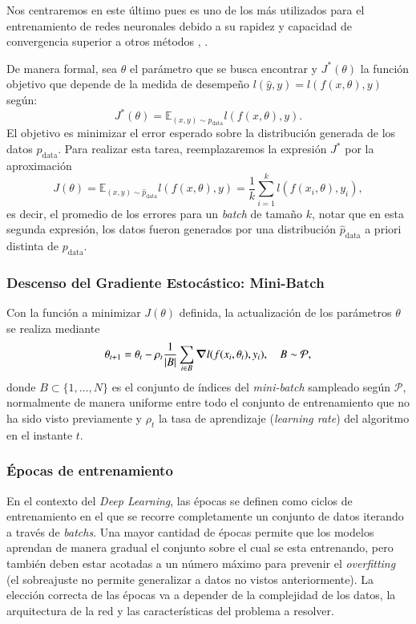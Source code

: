 Nos centraremos en este último pues es uno de los más utilizados para el entrenamiento de redes neuronales debido a su rapidez y capacidad de convergencia superior a otros métodos \cite{WILSON20031429}, \cite{article}.

\vspace{0.2cm}

De manera formal, sea $\theta$ el parámetro que se busca encontrar y $J^{*}(\theta)$ la función objetivo que depende de la medida de desempeño $l(\hat{y},y) = l(f(x , \theta),y) $ según: 
\[
J^{*}(\theta) = \mathbb{E}_{(x,y) \sim p_{\text{data}}} l(f(x , \theta),y) .
\]
El objetivo es minimizar el error esperado sobre la distribución generada de los datos $p_{\text{data}}$. Para realizar esta tarea, reemplazaremos la expresión $J^{*}$ por la aproximación 
\[
J(\theta) = \mathbb{E}_{(x,y) \sim \hat{p}_{\text{data}}} l(f(x , \theta),y) = \frac{1}{k}\sum_{i=1}^{k}l(f(x_i , \theta),y_i) , 
\]
es decir, el promedio de los errores para un \textit{batch} de tamaño $k$, notar que en esta segunda expresión, los datos fueron generados por una distribución $\hat{p}_{\text{data}}$ a priori distinta de $p_{\text{data}}$. 

\subsubsection{Descenso del Gradiente Estocástico: Mini-Batch}

Con la función a minimizar $J(\theta)$ definida, la actualización de los parámetros $\theta$ se realiza mediante 
\[
\theta_{t+1} = \theta_t - \rho_t \frac{1}{|B|}\sum_{i \in B}\grad l(f(x_i , \theta_t),y_i) , \quad B \sim \mathcal{P} ,  
\]
donde $B \subset \{1 , \dots , N\}$ es el conjunto de índices del \textit{mini-batch} sampleado según $\mathcal{P}$, normalmente de manera uniforme entre todo el conjunto de entrenamiento que no ha sido visto previamente y $\rho_t$ la tasa de aprendizaje (\textit{learning rate}) del algoritmo en el instante $t$. 

\subsubsection{Épocas de entrenamiento}

En el contexto del \textit{Deep Learning}, las épocas se definen como ciclos de entrenamiento en el que se recorre completamente un conjunto de datos iterando a través de \textit{batchs}. Una mayor cantidad de épocas permite que los modelos aprendan de manera gradual el conjunto sobre el cual se esta entrenando, pero también deben estar acotadas a un número máximo para prevenir el \textit{overfitting} (el sobreajuste no permite generalizar a datos no vistos anteriormente). La elección correcta de las épocas va a depender de la complejidad de los datos, la arquitectura de la red y las características del problema a resolver. 

